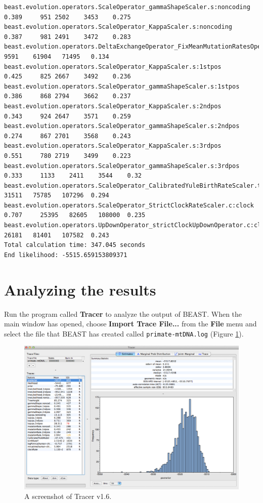\documentclass[11pt]{article}
\newcommand{\TracerVersion}{1.6}
\theoremstyle{plain}%
\theoremstyle{definition}
\theoremstyle{remark}
\begin{document}
{\begin{verbatim}
beast.evolution.operators.ScaleOperator_gammaShapeScaler.s:noncoding  0.389 	951	2502	3453	0.275 
beast.evolution.operators.ScaleOperator_KappaScaler.s:noncoding       0.387 	981	2491	3472	0.283 
beast.evolution.operators.DeltaExchangeOperator_FixMeanMutationRatesOperator0.381 	9591	61904	71495	0.134 
beast.evolution.operators.ScaleOperator_KappaScaler.s:1stpos          0.425 	825	2667	3492	0.236 
beast.evolution.operators.ScaleOperator_gammaShapeScaler.s:1stpos     0.386 	868	2794	3662	0.237 
beast.evolution.operators.ScaleOperator_KappaScaler.s:2ndpos          0.343 	924	2647	3571	0.259 
beast.evolution.operators.ScaleOperator_gammaShapeScaler.s:2ndpos     0.274 	867	2701	3568	0.243 
beast.evolution.operators.ScaleOperator_KappaScaler.s:3rdpos          0.551 	780	2719	3499	0.223 
beast.evolution.operators.ScaleOperator_gammaShapeScaler.s:3rdpos     0.333 	1133	2411	3544	0.32 
beast.evolution.operators.ScaleOperator_CalibratedYuleBirthRateScaler.t:tree0.260 	31511	75785	107296	0.294 
beast.evolution.operators.ScaleOperator_StrictClockRateScaler.c:clock 0.707 	25395	82605	108000	0.235 
beast.evolution.operators.UpDownOperator_strictClockUpDownOperator.c:clock0.592 	26181	81401	107582	0.243 
Total calculation time: 347.045 seconds
End likelihood: -5515.659153809371
\end{verbatim}}

\section{Analyzing the results}

Run the program called {\bf Tracer} to analyze the output of BEAST. When the main
window has opened, choose {\bf Import Trace File...} from the {\bf File} menu and select the file that
BEAST has created called \texttt{primate-mtDNA.log} (Figure \ref{fig:Tracer1}).

\begin{figure}
\includegraphics[width=\textwidth]{figures/Tracer1}
\caption{A screenshot of Tracer v{\TracerVersion}.}
\label{fig:Tracer1}
\end{figure}
\end{document}
